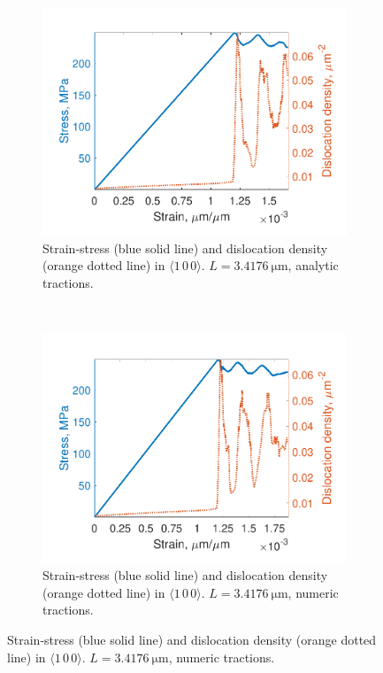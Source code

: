 \begin{figure}
    \centering
    \begin{subfigure}[t]{0.45\linewidth}
        \includegraphics[width=\linewidth]{../data/density_11-Mar-2021_8_tensile_ni_100.pdf}
        \caption{Strain-stress (blue solid line) and dislocation density (orange dotted line) in $\langle 1\, 0\, 0 \rangle$. $L = \SI{3.4176}{\micro\metre}$, analytic tractions.}
        \label{sf:sressDens1}
    \end{subfigure}
    ~
    \begin{subfigure}[t]{0.45\linewidth}
        \includegraphics[width=\linewidth]{../data/density_11-Mar-2021_numT_8_tensile_ni_100.pdf}
        \caption{Strain-stress (blue solid line) and dislocation density (orange dotted line) in $\langle 1\, 0\, 0 \rangle$. $L = \SI{3.4176}{\micro\metre}$, numeric tractions.}
        \label{sf:sressDens2}
    \end{subfigure}


\end{figure}
